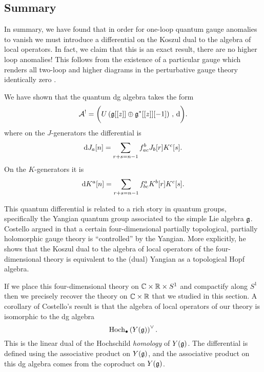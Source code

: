 \documentclass[11pt]{amsart}
\begin{document}
\subsection{Summary} 

In summary, we have found that in order for one-loop quantum gauge anomalies to vanish we must introduce a differential on the Koszul dual to the algebra of local operators.
In fact, we claim that this is an exact result, there are no higher loop anomalies!
This follows from the existence of a particular gauge which renders all two-loop and higher diagrams in the perturbative gauge theory identically zero \cite{GWcs}. 

We have shown that the quantum dg algebra takes the form
\[
\mathcal A^! = \bigg( U\left(\mathfrak g[[z]] \oplus \mathfrak g^*[[z]] [-1] \right) \, , \, {\rm d} \bigg) .
\]
where on the $J$-generators the differential is
\[
{\rm d} J_a[n] = \sum_{r + s = n-1} f_{ac}^b J_b[r] K^c[s]  .
\]
On the $K$-generators it is
\[
{\rm d} K^a[n] = \sum_{r + s = n-1} f_{bc}^a K^b[r] K^c [s] .
\]

This quantum differential is related to a rich story in quantum groups, specifically the Yangian quantum group associated to the simple Lie algebra $\mathfrak g$. 
Costello argued in \cite{CYangian} that a certain four-dimensional partially topological, partially holomorphic gauge theory is ``controlled'' by the Yangian.
More explicitly, he shows that the Koszul dual to the algebra of local operators of the four-dimensional theory is equivalent to the (dual) Yangian as a topological Hopf algebra.  

If we place this four-dimensional theory on $\mathbb C \times \mathbb R \times S^1$ and compactify along $S^1$ then we precisely recover the theory on $\mathbb C \times \mathbb R$ that we studied in this section. 
A corollary of Costello's result is that the algebra of local operators of our theory is isomorphic to the dg algebra
\[
{\rm Hoch}_{\bullet}\left( Y (\mathfrak g) \right)^\vee .
\]
This is the linear dual of the Hochschild {\em homology} of $Y(\mathfrak g)$. The differential is defined using the associative product on $Y(\mathfrak g)$, and the associative product on this dg algebra comes from the coproduct on $Y(\mathfrak g)$. 
\end{document}

